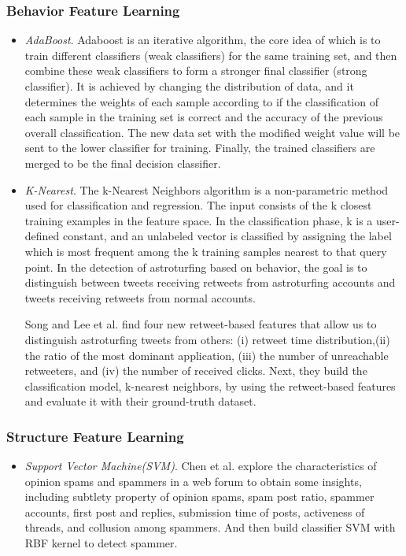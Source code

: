\documentclass[lettersize,journal]{IEEEtran}
\begin{document}
\subsubsection{Behavior Feature Learning}
\begin{itemize}
\item \emph{AdaBoost}.
Adaboost is an iterative algorithm, the core idea of which is to train different classifiers (weak classifiers) for the same training set, and then combine these weak classifiers to form a stronger final classifier (strong classifier). It is achieved by changing the distribution of data, and it determines the weights of each sample according to if the classification of each sample in the training set  is correct and the accuracy of the previous overall classification. The new data set with the modified weight value will be sent to the lower classifier for training. Finally, the trained classifiers are merged to be the final decision classifier.

\item \emph{K-Nearest}.
The k-Nearest Neighbors algorithm is a non-parametric method used for classification and regression. The input consists of the k closest training examples in the feature space. In the classification phase, k is a user-defined constant, and an unlabeled vector is classified by assigning the label which is most frequent among the k training samples nearest to that query point. In the detection of astroturfing based on behavior, the goal is to distinguish between tweets receiving retweets from astroturfing accounts and tweets receiving retweets from normal accounts.

Song and Lee et al.\cite{Song2015CrowdTarget} find four new retweet-based features that allow us to distinguish astroturfing tweets from others: (i) retweet time distribution,(ii) the ratio of the most dominant application, (iii) the number of unreachable retweeters, and (iv) the number of received clicks. Next, they build the classification model, k-nearest neighbors, by using the retweet-based features and evaluate it with their ground-truth dataset.

\end{itemize}

\subsubsection{Structure Feature Learning}
\begin{itemize}
\item \emph{Support Vector Machine(SVM)}.
Chen et al.\cite{ChenOpinion} explore the characteristics of opinion spams and spammers in a web forum to obtain some insights, including subtlety property of opinion spams, spam post ratio, spammer accounts, first post and replies, submission time of posts, activeness of threads, and collusion among spammers. And then build classifier SVM with RBF kernel to detect spammer.
\end{itemize}
\end{document}
